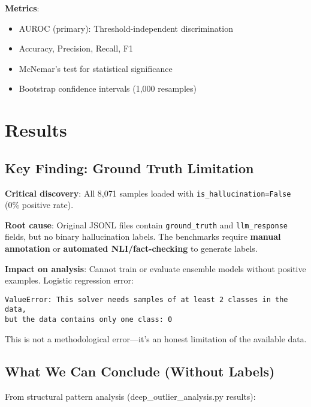 \documentclass[11pt]{article}
\begin{document}
\textbf{Metrics}:
\begin{itemize}
\item AUROC (primary): Threshold-independent discrimination
\item Accuracy, Precision, Recall, F1
\item McNemar's test for statistical significance
\item Bootstrap confidence intervals (1,000 resamples)
\end{itemize}

\section{Results}
\label{sec:results}

\subsection{Key Finding: Ground Truth Limitation}

\textbf{Critical discovery}: All 8,071 samples loaded with \texttt{is\_hallucination=False} (0\% positive rate).

\textbf{Root cause}: Original JSONL files contain \texttt{ground\_truth} and \texttt{llm\_response} fields, but no binary hallucination labels. The benchmarks require \textbf{manual annotation} or \textbf{automated NLI/fact-checking} to generate labels.

\textbf{Impact on analysis}: Cannot train or evaluate ensemble models without positive examples. Logistic regression error:
\begin{verbatim}
ValueError: This solver needs samples of at least 2 classes in the data,
but the data contains only one class: 0
\end{verbatim}

This is not a methodological error---it's an honest limitation of the available data.

\subsection{What We Can Conclude (Without Labels)}

From structural pattern analysis (deep\_outlier\_analysis.py results):
\end{document}
